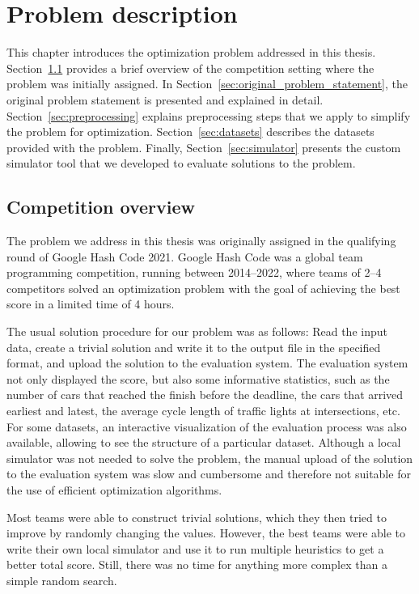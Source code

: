 \chapter{Problem description} \label{chap:problem_description}

This chapter introduces the optimization problem addressed in this thesis. Section~\ref{sec:competition_overview} provides a brief overview of the competition setting where the problem was initially assigned. In Section~\ref{sec:original_problem_statement}, the original problem statement is presented and explained in detail.
Section~\ref{sec:preprocessing} explains preprocessing steps that we apply to simplify the problem for optimization.
Section~\ref{sec:datasets} describes the datasets provided with the problem. Finally, Section~\ref{sec:simulator} presents the custom simulator tool that we developed to evaluate solutions to the problem.

\section{Competition overview} \label{sec:competition_overview}

The problem we address in this thesis was originally assigned in the qualifying round of Google Hash Code 2021. Google Hash Code was a global team programming competition, running between 2014--2022, where teams of 2--4 competitors solved an optimization problem with the goal of achieving the best score in a limited time of 4 hours.

The usual solution procedure for our problem was as follows: Read the input data, create a trivial solution and write it to the output file in the specified format, and upload the solution to the evaluation system. The evaluation system not only displayed the score, but also some informative statistics, such as the number of cars that reached the finish before the deadline, the cars that arrived earliest and latest, the average cycle length of traffic lights at intersections, etc.
For some datasets, an interactive visualization of the evaluation process was also available, allowing to see the structure of a particular dataset. Although a local simulator was not needed to solve the problem, the manual upload of the solution to the evaluation system was slow and cumbersome and therefore not suitable for the use of efficient optimization algorithms.

Most teams were able to construct trivial solutions, which they then tried to improve by randomly changing the values. However, the best teams were able to write their own local simulator and use it to run multiple heuristics to get a better total score. Still, there was no time for anything more complex than a simple random search.


